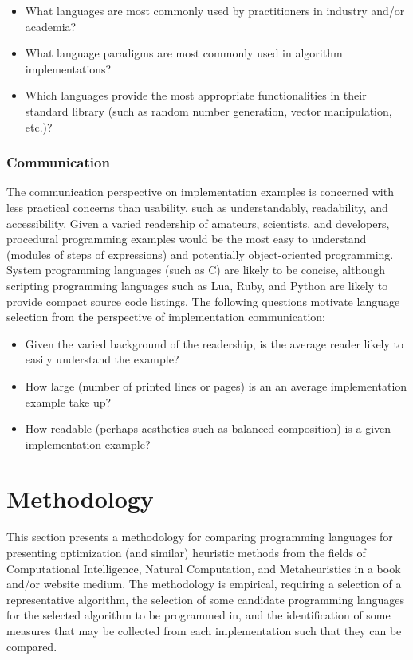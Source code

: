 \documentclass[a4paper, 11pt]{article}
\begin{document}
\begin{itemize}
	\item What languages are most commonly used by practitioners in industry and/or academia?
	\item What language paradigms are most commonly used in algorithm implementations?
	\item Which languages provide the most appropriate functionalities in their standard library (such as random number generation, vector manipulation, etc.)?
\end{itemize}

\subsubsection{Communication}
The communication perspective on implementation examples is concerned with less practical concerns than usability, such as understandably, readability, and accessibility. 
Given a varied readership of amateurs, scientists, and developers, procedural programming examples would be the most easy to understand (modules of steps of expressions) and potentially object-oriented programming. System programming languages (such as C) are likely to be concise, although scripting programming languages such as Lua, Ruby, and Python are likely to provide compact source code listings.
The following questions motivate language selection from the perspective of implementation communication:

\begin{itemize}
	\item Given the varied background of the readership, is the average reader likely to easily understand the example?
	\item How large (number of printed lines or pages) is an an average implementation example take up?
	\item How readable (perhaps aesthetics such as balanced composition) is a given implementation example?	
\end{itemize}

% 
%
\section{Methodology}
\label{sec:methodology}
This section presents a methodology for comparing programming languages for presenting optimization (and similar) heuristic methods from the fields of Computational Intelligence, Natural Computation, and Metaheuristics in a book and/or website medium. The methodology is empirical, requiring a selection of a representative algorithm, the selection of some candidate programming languages for the selected algorithm to be programmed in, and the identification of some measures that may be collected from each implementation such that they can be compared.
\end{document}
